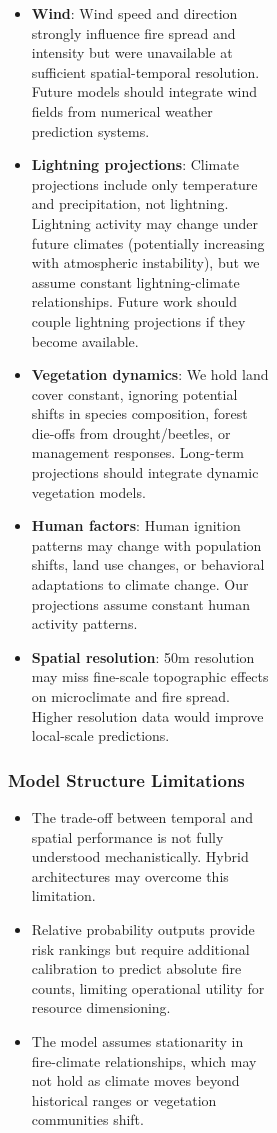\documentclass[11pt,a4paper]{article}
\begin{document}
\begin{figure}[H]
\begin{figure}[H]
\begin{figure}[H]
\begin{itemize}
    \item \textbf{Wind}: Wind speed and direction strongly influence fire spread and intensity but were unavailable at sufficient spatial-temporal resolution. Future models should integrate wind fields from numerical weather prediction systems.
    \item \textbf{Lightning projections}: Climate projections include only temperature and precipitation, not lightning. Lightning activity may change under future climates (potentially increasing with atmospheric instability), but we assume constant lightning-climate relationships. Future work should couple lightning projections if they become available.
    \item \textbf{Vegetation dynamics}: We hold land cover constant, ignoring potential shifts in species composition, forest die-offs from drought/beetles, or management responses. Long-term projections should integrate dynamic vegetation models.
    \item \textbf{Human factors}: Human ignition patterns may change with population shifts, land use changes, or behavioral adaptations to climate change. Our projections assume constant human activity patterns.
    \item \textbf{Spatial resolution}: 50m resolution may miss fine-scale topographic effects on microclimate and fire spread. Higher resolution data would improve local-scale predictions.
\end{itemize}

\subsubsection{Model Structure Limitations}

\begin{itemize}
    \item The trade-off between temporal and spatial performance is not fully understood mechanistically. Hybrid architectures may overcome this limitation.
    \item Relative probability outputs provide risk rankings but require additional calibration to predict absolute fire counts, limiting operational utility for resource dimensioning.
    \item The model assumes stationarity in fire-climate relationships, which may not hold as climate moves beyond historical ranges or vegetation communities shift.
\end{itemize}


\end{figure}
\end{figure}
\end{figure}
\end{document}
